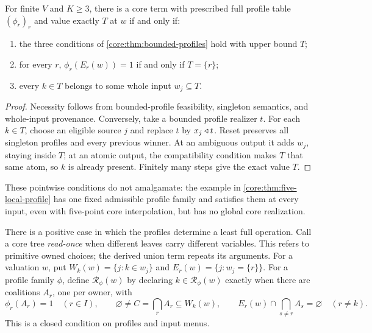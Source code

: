 \begin{theorem}\label{core:thm:one-point-completion}
For finite $V$ and $K\geq3$, there is a core term with prescribed full
profile table $(\phi_r)_r$ and value exactly $T$ at $w$ if and only if:
\begin{enumerate}
\item the three conditions of \cref{core:thm:bounded-profiles} hold
  with upper bound $T$;
\item for every $r$, $\phi_r(E_r(w))=1$ if and only if $T=\{r\}$;
\item every $k\in T$ belongs to some whole input $w_j\subseteq T$.
\end{enumerate}
\end{theorem}
\begin{proof}
Necessity follows from bounded-profile feasibility, singleton semantics,
and whole-input provenance. Conversely, take a bounded profile realizer
$t$. For each $k\in T$, choose an eligible source $j$ and replace $t$ by
$x_j\mathbin{\triangleleft} t$. Reset preserves all singleton profiles and every previous
winner. At an ambiguous output it adds $w_j$, staying inside $T$; at an
atomic output, the compatibility condition makes $T$ that same atom, so
$k$ is already present. Finitely many steps give the exact value $T$.
\end{proof}

These pointwise conditions do not amalgamate: the example in
\cref{core:thm:five-local-profile} has one fixed admissible profile family
and satisfies them at every input, even with five-point core interpolation,
but has no global core realization.





There is a positive case in which the profiles determine a least full
operation. Call a core tree \emph{read-once} when different leaves carry
different variables. This refers to primitive owned choices; the derived
union term repeats its arguments. For a valuation $w$, put
$W_k(w)=\{j:k\in w_j\}$ and $E_r(w)=\{j:w_j=\{r\}\}$.
For a profile family $\phi$, define $\mathcal R_\phi(w)$ by declaring
$k\in\mathcal R_\phi(w)$ exactly when there are coalitions $A_r$, one per
owner, with
\[
 \phi_r(A_r)=1\quad(r\in I),\qquad
 \varnothing\ne C=\bigcap_r A_r\subseteq W_k(w),\qquad
 E_r(w)\cap\bigcap_{s\ne r}A_s=\varnothing\quad(r\ne k).
\]
This is a closed condition on profiles and input menus.

